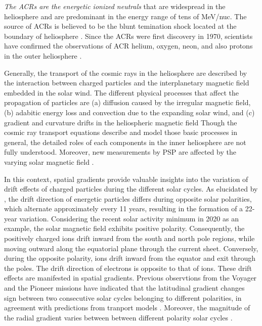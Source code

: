 \emph{The \acp{ACR} are the energetic ionized neutrals} that are widespread in the heliosphere and are predominant in the energy range of tens of MeV/nuc. The source of \acp{ACR} is believed to be the blunt temination shock located at the boundary of heliosphere \citep{McComas2006GeoRL}. Since the \acp{ACR} were first discovery in 1970, scientists have confirmed the observations of \ac{ACR} helium, oxygen, neon, and also protons in the outer heliosphere \citep{Garcia1973ICRC,Hoverstadt1973PhRvL,McDonald1974ApJ,Potgieter2013LRSP}.

Generally, the transport of the cosmic rays in the heliosphere are described by the interaction between charged particles and the interplanetary magnetic field embedded in the solar wind. The different physical processes that affect the propagation of particles are (a) diffusion caused by the irregular magnetic field, (b) adabitic energy loss and convection due to the expanding solar wind, and (c) gradient and curvature drifts in the heliospheric magnetic field
Though the cosmic ray transport equations describe and model those basic processes \citep{Parker1965Pss,Jokipii1977ApJ,Jokipii1981ApJ,McDonald2001ICRC} in general, the detailed roles of each components in the inner heliosphere are not fully understood. Moreover, new measurements by \ac{PSP} are affected by the varying solar magnetic field \citep{Rankin2021ApJ}.

In this context, spatial gradients provide valuable insights into the variation of drift effects of charged particles during the different solar cycles. As elucidated by \citet{Jokipii1977ApJ, Jokipii1979ApJ, Potgieter2013LRSP}, the drift direction of energetic particles differs during opposite solar polarities, which alternate approximately every 11 years, resulting in the formation of a 22-year variation. Considering the recent solar activity minimum in 2020 as an example, the solar magnetic field exhibits positive polarity. Consequently, the positively charged ions drift inward from the south and north pole regions, while moving outward along the equatorial plane through the current sheet. Conversely, during the opposite polarity, ions drift inward from the equator and exit through the poles. The drift direction of electrons is opposite to that of ions. These drift effects are manifested in spatial gradients. Previous observtions from the Voyager and the Pioneer missions have indicated that the latitudinal gradient changes sign between two consecutive solar cycles belonging to different polarities, in agreement with predictions from tranport models \citep{Mckibben1979ApJ, Cummings1987GeoRL, Christon1986JGR}. Moreover, the magnitude of the radial gradient varies between between different polarity solar cycles \citep{Rankin2021ApJ,Rankin2022ApJ,Giacalone2022SSRv,Webber1981JGR,Marsden1999AdSpR}.

